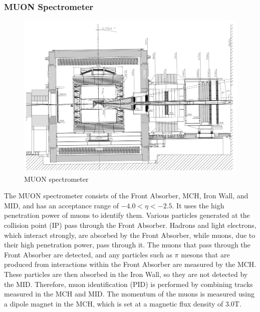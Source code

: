         \subsubsection{MUON Spectrometer}
            \begin{figure}
                \centering
                \includegraphics[keepaspectratio, scale=0.25]{fig/2_2_MUONspectrometer.png}
                \caption{MUON spectrometer}
            \end{figure}
            The MUON spectrometer consists of the Front Absorber, MCH, Iron Wall, and MID, and has an acceptance range of $-4.0 < \eta < -2.5$. It uses the high penetration power of muons to identify them. Various particles generated at the collision point (IP) pass through the Front Absorber. Hadrons and light electrons, which interact strongly, are absorbed by the Front Absorber, while muons, due to their high penetration power, pass through it. The muons that pass through the Front Absorber are detected, and any particles such as $\pi$ mesons that are produced from interactions within the Front Absorber are measured by the MCH. These particles are then absorbed in the Iron Wall, so they are not detected by the MID. Therefore, muon identification (PID) is performed by combining tracks measured in the MCH and MID. The momentum of the muons is measured using a dipole magnet in the MCH, which is set at a magnetic flux density of 3.0T.

